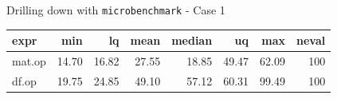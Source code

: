 \begin{frame}[fragile]{Drilling down with \texttt{microbenchmark} - Case
1}

\begin{Shaded}
\begin{Highlighting}[]
\NormalTok{(}\NormalTok{)}

\StringTok{ }\NormalTok{(} 
                      
\end{Highlighting}
\end{Shaded}

\begin{Shaded}
\begin{Highlighting}[]
\end{Highlighting}
\end{Shaded}

\begin{longtable}[c]{@{}lrrrrrrr@{}}
\toprule
expr & min & lq & mean & median & uq & max & neval\tabularnewline
\midrule
\endhead
mat.op & 14.70 & 16.82 & 27.55 & 18.85 & 49.47 & 62.09 &
100\tabularnewline
df.op & 19.75 & 24.85 & 49.10 & 57.12 & 60.31 & 99.49 &
100\tabularnewline
\bottomrule
\end{longtable}

\end{frame}

